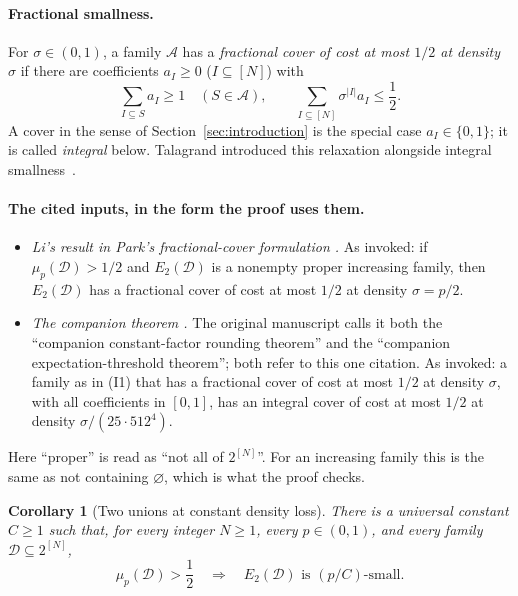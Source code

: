 \documentclass[11pt,letterpaper]{article}
\newtheorem{corollary}[theorem]{Corollary}
\theoremstyle{definition}
\theoremstyle{remark}
\numberwithin{equation}{section}
\begin{document}
\paragraph{Fractional smallness.}
For $\sigma\in(0,1)$, a family $\mathcal A$ has a \emph{fractional cover
of cost at most $1/2$ at density $\sigma$} if there are coefficients
$a_I\ge0$ ($I\subseteq[N]$) with
\[
\sum_{I\subseteq S}a_I\ge1\quad(S\in\mathcal A),
\qquad
\sum_{I\subseteq[N]}\sigma^{|I|}a_I\le\frac12.
\]
A cover in the sense of Section~\ref{sec:introduction} is the special case
$a_I\in\{0,1\}$; it is called \emph{integral} below. Talagrand introduced
this relaxation alongside integral
smallness~\cite[Sections~6 and~7]{Talagrand10}.

\paragraph{The cited inputs, in the form the proof uses them.}
\begin{itemize}
\item[(I1)] \emph{Li's result \cite[Corollary~3.1]{Li26} in Park's
fractional-cover formulation \cite[Theorem~3.4]{Park26}.} As invoked: if
$\mu_p(\mathcal D)>1/2$ and $E_2(\mathcal D)$ is a nonempty proper
increasing family, then $E_2(\mathcal D)$ has a fractional cover of cost
at most $1/2$ at density $\sigma=p/2$.
\item[(I2)] \emph{The companion theorem
\cite[Theorem~1.1]{OpenAIThreshold26}.} The original manuscript calls it
both the ``companion constant-factor rounding theorem'' and the
``companion expectation-threshold theorem''; both refer to this one
citation. As invoked: a family as in (I1) that has a fractional cover of
cost at most $1/2$ at density $\sigma$, with all coefficients in $[0,1]$,
has an integral cover of cost at most $1/2$ at density
$\sigma/(25\cdot512^4)$.
\end{itemize}
Here ``proper'' is read as ``not all of $2^{[N]}$''. For an increasing
family this is the same as not containing $\varnothing$, which is what the
proof checks.

\begin{corollary}[Two unions at constant density loss]
\label{cor:two-union}
There is a universal constant $C\ge1$ such that, for every integer $N\ge1$,
every $p\in(0,1)$, and every family $\mathcal D\subseteq2^{[N]}$,
\[
\mu_p(\mathcal D)>\frac12
\quad\Longrightarrow\quad
E_2(\mathcal D)\text{ is }(p/C)\text{-small}.
\]
\end{corollary}
\end{document}
